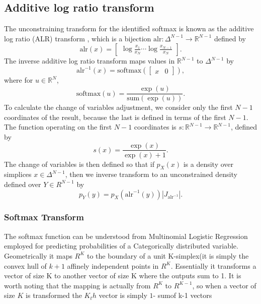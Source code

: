 \documentclass[11pt]{article}
\newcommand{\abs}[1]{\left| #1 \right|}
\newcommand{\absdet}[1]{\abs{#1}}
\begin{document}
\subsection{Additive log ratio transform}

The unconstraining transform for the identified softmax is known as
the additive log ratio (ALR) transform \cite{aitchison???}, which is a
bijection $\textrm{alr}:\Delta^{N-1} \rightarrow \mathbb{R}^{N-1}$ defined by
\[
  \textrm{alr}(x)
  = \begin{bmatrix}\displaystyle
    \log \frac{x_1}{x_N} \cdots \log \frac{x_{N-1}}{x_N}
  \end{bmatrix}.
\]
The inverse additive log ratio transform maps values in $\mathbb{R}^{N-1}$ to
$\Delta^{N-1}$ by
\[
  \textrm{alr}^{-1}(x) = \textrm{softmax}(\begin{bmatrix}x &  0\end{bmatrix}),
\]
where for $u \in \mathbb{R}^N$,
\[
  \textrm{softmax}(u) = \frac{\exp(u)}{\textrm{sum}(\exp(u))}.
\]
To calculate the change of variables adjustment, we consider only the
first $N-1$ coordinates of the result, because the last is defined in
terms of the first $N-1$.  The function operating on the first $N-1$
coordinates is $s:\mathbb{R}^{N-1} \rightarrow \mathbb{R}^{N-1}$, defined by
\[
  s(x) = \frac{\exp(x)}{\exp(x) + 1}.
\]
The change of variables is then defined so that if $p_X(x)$ is a
density over simplices $x \in \Delta^{N-1}$, then we inverse transform
to an unconstrained density defined over $Y \in R^{N-1}$ by
\[
  p_Y(y) = p_X(\textrm{alr}^{-1}(y)) \absdet{J_{\textrm{alr}^{-1}}}.
\]



  



\subsubsection{Softmax Transform}

The softmax function can be understood from Multinomial Logistic
Regression employed for predicting probabilities of a Categorically
distributed variable. Geometrically it maps $R^K$ to the boundary of a
unit K-simplex(it is simply the convex hull of $k+1$ affinely
independent points in $R^K$. Essentially it transforms a vector of
size K to another vector of size K where the outputs sum to 1. It is
worth noting that the mapping is actually from $R^K$ to $R^{K-1}$, so
when a vector of size $K$ is transformed the $K_th$ vector is simply
$1$- sumof k-1 vectors
\end{document}
